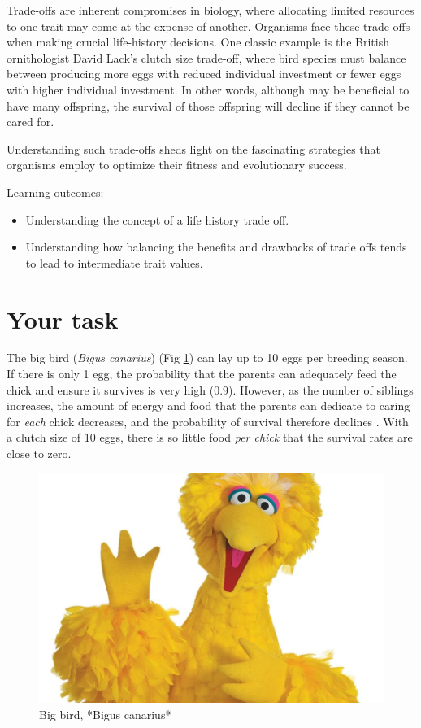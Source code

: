 \documentclass[
  a4paper]{book}
\providecommand{\tightlist}{%
  \setlength{\itemsep}{0pt}\setlength{\parskip}{0pt}}
\begin{document}
Trade-offs are inherent compromises in biology, where allocating limited resources to one trait may come at the expense of another. Organisms face these trade-offs when making crucial life-history decisions. One classic example is the British ornithologist David Lack's clutch size trade-off, where bird species must balance between producing more eggs with reduced individual investment or fewer eggs with higher individual investment. In other words, although may be beneficial to have many offspring, the survival of those offspring will decline if they cannot be cared for.

Understanding such trade-offs sheds light on the fascinating strategies that organisms employ to optimize their fitness and evolutionary success.

\begin{do-something}
Learning outcomes:

\begin{itemize}
\tightlist
\item
  Understanding the concept of a life history trade off.
\item
  Understanding how balancing the benefits and drawbacks of trade offs
  tends to lead to intermediate trait values.
\end{itemize}
\end{do-something}

\hypertarget{your-task-7}{%
\section{Your task}\label{your-task-7}}

The big bird (\emph{Bigus canarius}) (Fig \ref{fig:bigbird}) can lay up to 10 eggs per breeding season. If there is only 1 egg, the probability that the parents can adequately feed the chick and ensure it survives is very high (0.9). However, as the number of siblings increases, the amount of energy and food that the parents can dedicate to caring for \emph{each} chick decreases, and the probability of survival therefore declines . With a clutch size of 10 eggs, there is so little food \emph{per chick} that the survival rates are close to zero.

\begin{figure}

{\centering \includegraphics[width=0.5\linewidth]{images/bigbird} 

}

\caption{Big bird, *Bigus canarius*}\label{fig:bigbird}
\end{figure}
\end{document}
